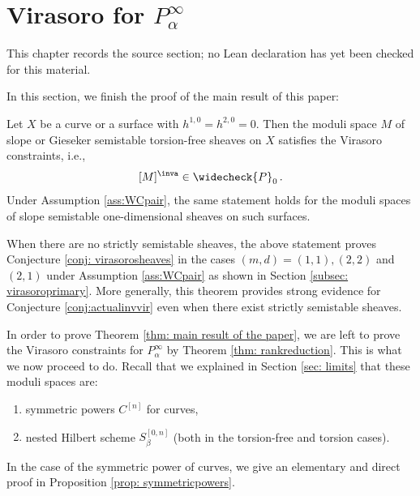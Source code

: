 \chapter{Virasoro for $P_\alpha^\infty$}
\label{virasoro-constraints-moduli-sheaves-vertex-algebras-chapter-06}

\begin{remark}
\label{virasoro-constraints-moduli-sheaves-vertex-algebras-chapter-06-source}
This chapter records the source section; no Lean declaration has yet been checked for this material.
\notready
\end{remark}

\label{sec:lowrank}

In this section, we finish the proof of the main result of this paper:

\begin{theorem}
\notready\label{thm: main result of the paper}
    Let $X$ be a curve or a surface with $h^{1,0}=h^{2,0}=0$. Then the moduli space $M$ of slope or Gieseker semistable torsion-free sheaves on $X$ satisfies the Virasoro constraints, i.e.,
    \[[M]^{\inva}\in \widecheck{P}_0\,.\]
    Under Assumption \ref{ass:WCpair}, the same statement holds for the moduli spaces of slope semistable one-dimensional sheaves on such surfaces.
\end{theorem}
When there are no strictly semistable sheaves, the above statement proves Conjecture \ref{conj: virasorosheaves} in the cases $(m,d) = (1,1), (2,2)$ and $(2,1)$ under Assumption \ref{ass:WCpair} as shown in Section \ref{subsec: virasoroprimary}. More generally, this theorem provides strong evidence for Conjecture \ref{conj:actualinvvir} even when there exist strictly semistable sheaves.

In order to prove Theorem \ref{thm: main result of the paper}, we are left to prove the Virasoro constraints for $P_\alpha^\infty$ by Theorem \ref{thm: rankreduction}. This is what we now proceed to do. Recall that we explained in Section \ref{sec: limits} that these moduli spaces are:
\begin{enumerate}
    \item symmetric powers $C^{[n]}$ for curves,
    \item nested Hilbert scheme $S_\beta^{[0,n]}$ (both in the torsion-free and torsion cases).
\end{enumerate}
In the case of the symmetric power of curves, we give an elementary and direct proof in Proposition \ref{prop: symmetricpowers}.

